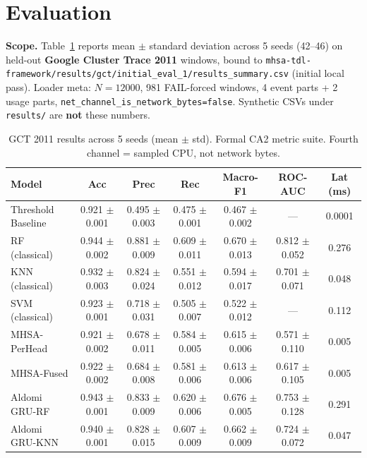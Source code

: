 
\section{Evaluation}
\label{sec:Evaluation}

\textbf{Scope.} Table~\ref{tab:results} reports mean $\pm$ standard deviation across 5 seeds (42--46) on held-out \textbf{Google Cluster Trace 2011} windows, bound to \texttt{mhsa-tdl-framework/results/gct/initial\_eval\_1/results\_summary.csv} (initial local pass). Loader meta: $N{=}12000$, 981 FAIL-forced windows, 4 event parts + 2 usage parts, \texttt{net\_channel\_is\_network\_bytes=false}. Synthetic CSVs under \texttt{results/} are \textbf{not} these numbers.

\begin{table}[htp]
\centering
\caption{GCT 2011 results across 5 seeds (mean $\pm$ std). Formal CA2 metric suite. Fourth channel = sampled CPU, not network bytes.}
\label{tab:results}
\begin{tabular}{lcccccc}
\hline
Model & Acc & Prec & Rec & Macro-F1 & ROC-AUC & Lat (ms) \\
\hline
Threshold Baseline & 0.921 $\pm$ 0.001 & 0.495 $\pm$ 0.003 & 0.475 $\pm$ 0.001 & 0.467 $\pm$ 0.002 & --- & 0.0001 \\
RF (classical) & 0.944 $\pm$ 0.002 & 0.881 $\pm$ 0.009 & 0.609 $\pm$ 0.011 & 0.670 $\pm$ 0.013 & 0.812 $\pm$ 0.052 & 0.276 \\
KNN (classical) & 0.932 $\pm$ 0.003 & 0.824 $\pm$ 0.024 & 0.551 $\pm$ 0.012 & 0.594 $\pm$ 0.017 & 0.701 $\pm$ 0.071 & 0.048 \\
SVM (classical) & 0.923 $\pm$ 0.001 & 0.718 $\pm$ 0.031 & 0.505 $\pm$ 0.007 & 0.522 $\pm$ 0.012 & --- & 0.112 \\
MHSA-PerHead & 0.921 $\pm$ 0.002 & 0.678 $\pm$ 0.011 & 0.584 $\pm$ 0.005 & 0.615 $\pm$ 0.006 & 0.571 $\pm$ 0.110 & 0.005 \\
MHSA-Fused & 0.922 $\pm$ 0.002 & 0.684 $\pm$ 0.008 & 0.581 $\pm$ 0.006 & 0.613 $\pm$ 0.006 & 0.617 $\pm$ 0.105 & 0.005 \\
Aldomi GRU-RF & 0.943 $\pm$ 0.001 & 0.833 $\pm$ 0.009 & 0.620 $\pm$ 0.006 & 0.676 $\pm$ 0.005 & 0.753 $\pm$ 0.128 & 0.291 \\
Aldomi GRU-KNN & 0.940 $\pm$ 0.001 & 0.828 $\pm$ 0.015 & 0.607 $\pm$ 0.009 & 0.662 $\pm$ 0.009 & 0.724 $\pm$ 0.072 & 0.047 \\
\hline
\end{tabular}
\end{table}

